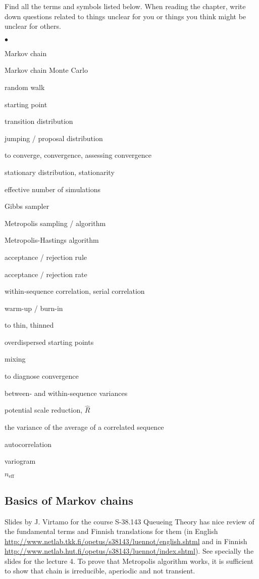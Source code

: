 \documentclass[a4paper,11pt,english]{article}
\begin{document}
Find all the terms and symbols listed below. When reading the chapter,
write down questions related to things unclear for you or things you
think might be unclear for others. 
\begin{list}{$\bullet$}{\parsep=0pt\itemsep=2pt}
\item Markov chain
\item Markov chain Monte Carlo
\item random walk
\item starting point
\item transition distribution
\item jumping / proposal distribution
\item to converge, convergence, assessing convergence
\item stationary distribution, stationarity
\item effective number of simulations
\item Gibbs sampler
\item Metropolis sampling / algorithm
\item Metropolis-Hastings algorithm
\item acceptance / rejection rule
\item acceptance / rejection rate
\item within-sequence correlation, serial correlation
\item warm-up / burn-in
\item to thin, thinned
\item overdispersed starting points
\item mixing
\item to diagnose convergence
\item between- and within-sequence variances
\item potential scale reduction, $\hat{R}$
\item the variance of the average of a correlated sequence
\item autocorrelation
\item variogram
\item $n_{\mathrm{eff}}$
\end{list}

\subsection*{Basics of Markov chains}

Slides by J. Virtamo for the course S-38.143 Queueing Theory has nice
review of the fundamental terms and Finnish translations for them (in
English
\url{http://www.netlab.tkk.fi/opetus/s38143/luennot/english.shtml} and
in Finnish
\url{http://www.netlab.hut.fi/opetus/s38143/luennot/index.shtml}). See
specially the slides for the lecture 4. To prove that Metropolis
algorithm works, it is sufficient to show that chain is irreducible,
aperiodic and not transient.
\end{document}
